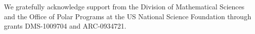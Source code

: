 \documentclass[english,12pt,jmp,graphicx]{revtex4-1}
\begin{document}
%

\begin{acknowledgments}
We gratefully acknowledge support from the Division of Mathematical
Sciences and the Office of Polar Programs at the US National Science
Foundation through grants DMS-1009704 and ARC-0934721.
\end{acknowledgments}



\end{document}
